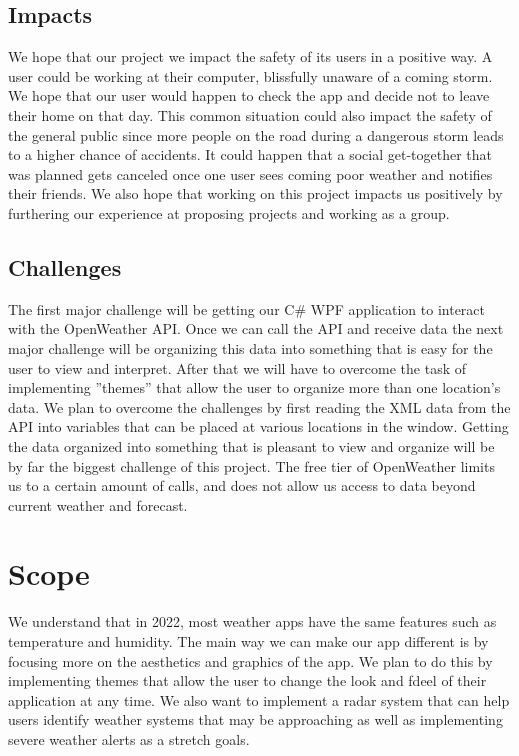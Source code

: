 \documentclass[10pt,conference,onecolumn,compsoc]{IEEEtran}
\begin{document}

\subsection{Impacts}
We hope that our project we impact the safety of its users in a positive way. A user could be working at their computer, blissfully unaware of a coming storm. We hope that our user would happen to check the app and decide not to leave their home on that day. This common situation could also impact the safety of the general public since more people on the road during a dangerous storm leads to a higher chance of accidents. It could happen that a social get-together that was planned gets canceled once one user sees coming poor weather and notifies their friends. We also hope that working on this project impacts us positively by furthering our experience at proposing projects and working as a group.  	



\subsection{Challenges}
	The first major challenge will be getting our C\# WPF application to interact with the OpenWeather API. Once we can call the API and receive data the next major challenge will be organizing this data into something that is easy for the user to view and interpret. After that we will have to overcome the task of implementing ''themes'' that allow the user to organize more than one location's data. We plan to overcome the challenges by first reading the XML data from the API into variables that can be placed at various locations in the window. Getting the data organized into something that is pleasant to view and organize will be by far the biggest challenge of this project. The free tier of OpenWeather limits us to a certain amount of calls, and does not allow us access to data beyond current weather and forecast.


\section{Scope}
	We understand that in 2022, most weather apps have the same features such as temperature and humidity. The main way we can make our app different is by focusing more on the aesthetics and graphics of the app. We plan to do this by implementing themes that allow the user to change the look and fdeel of their application at any time. We also want to implement a radar system that can help users identify weather systems that may be approaching as well as implementing severe weather alerts as a stretch goals.
\end{document}
